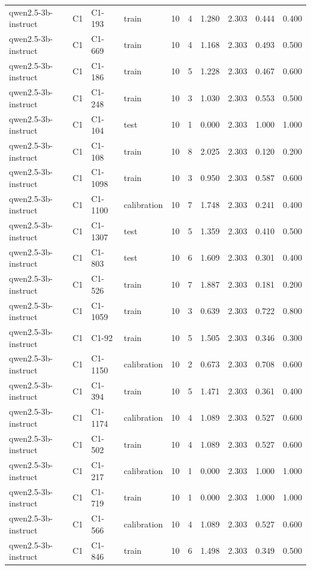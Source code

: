 \begin{table}
\begin{tabular}{llllrrrrrr}
qwen2.5-3b-instruct & C1 & C1-193 & train & 10 & 4 & 1.280 & 2.303 & 0.444 & 0.400 \\
qwen2.5-3b-instruct & C1 & C1-669 & train & 10 & 4 & 1.168 & 2.303 & 0.493 & 0.500 \\
qwen2.5-3b-instruct & C1 & C1-186 & train & 10 & 5 & 1.228 & 2.303 & 0.467 & 0.600 \\
qwen2.5-3b-instruct & C1 & C1-248 & train & 10 & 3 & 1.030 & 2.303 & 0.553 & 0.500 \\
qwen2.5-3b-instruct & C1 & C1-104 & test & 10 & 1 & 0.000 & 2.303 & 1.000 & 1.000 \\
qwen2.5-3b-instruct & C1 & C1-108 & train & 10 & 8 & 2.025 & 2.303 & 0.120 & 0.200 \\
qwen2.5-3b-instruct & C1 & C1-1098 & train & 10 & 3 & 0.950 & 2.303 & 0.587 & 0.600 \\
qwen2.5-3b-instruct & C1 & C1-1100 & calibration & 10 & 7 & 1.748 & 2.303 & 0.241 & 0.400 \\
qwen2.5-3b-instruct & C1 & C1-1307 & test & 10 & 5 & 1.359 & 2.303 & 0.410 & 0.500 \\
qwen2.5-3b-instruct & C1 & C1-803 & test & 10 & 6 & 1.609 & 2.303 & 0.301 & 0.400 \\
qwen2.5-3b-instruct & C1 & C1-526 & train & 10 & 7 & 1.887 & 2.303 & 0.181 & 0.200 \\
qwen2.5-3b-instruct & C1 & C1-1059 & train & 10 & 3 & 0.639 & 2.303 & 0.722 & 0.800 \\
qwen2.5-3b-instruct & C1 & C1-92 & train & 10 & 5 & 1.505 & 2.303 & 0.346 & 0.300 \\
qwen2.5-3b-instruct & C1 & C1-1150 & calibration & 10 & 2 & 0.673 & 2.303 & 0.708 & 0.600 \\
qwen2.5-3b-instruct & C1 & C1-394 & train & 10 & 5 & 1.471 & 2.303 & 0.361 & 0.400 \\
qwen2.5-3b-instruct & C1 & C1-1174 & calibration & 10 & 4 & 1.089 & 2.303 & 0.527 & 0.600 \\
qwen2.5-3b-instruct & C1 & C1-502 & train & 10 & 4 & 1.089 & 2.303 & 0.527 & 0.600 \\
qwen2.5-3b-instruct & C1 & C1-217 & calibration & 10 & 1 & 0.000 & 2.303 & 1.000 & 1.000 \\
qwen2.5-3b-instruct & C1 & C1-719 & train & 10 & 1 & 0.000 & 2.303 & 1.000 & 1.000 \\
qwen2.5-3b-instruct & C1 & C1-566 & calibration & 10 & 4 & 1.089 & 2.303 & 0.527 & 0.600 \\
qwen2.5-3b-instruct & C1 & C1-846 & train & 10 & 6 & 1.498 & 2.303 & 0.349 & 0.500 \\

\end{tabular}
\end{table}
